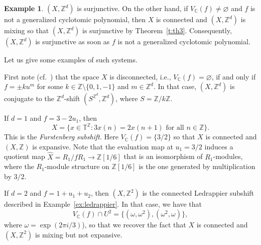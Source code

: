 \documentclass[12pt,a4paper]{amsart}
\theoremstyle{definition}
\newtheorem{example}[theorem]{Example}
\numberwithin{equation}{section}
\begin{document}
\begin{example}
$(X,{\mathbb{Z}}^d)$ is surjunctive.
On the other hand, if
$V_{\mathbb{C}}(f) \not= \varnothing$ and $f$ is not a generalized cyclotomic polynomial,
then $X$ is connected and $(X,{\mathbb{Z}}^d)$ is mixing so that $(X,{\mathbb{Z}}^d)$
is surjunctive 
by  Theorem~\ref{t:th3}.
Consequently, $(X,{\mathbb{Z}}^d)$ is surjunctive as soon as $f$ is not a generalized cyclotomic polynomial.
\par
Let us give some examples of such systems. 
\par
First note (cf.\ \cite[Lemma 6.7]{schmidt-book}) that the space $X$ is disconnected, i.e., $V_{\mathbb{C}}(f) = \varnothing$, if and only if 
$f = \pm k u^m$ for some $k \in {\mathbb{Z}} \setminus \{0, 1,-1\}$ and $m \in {\mathbb{Z}}^d$. In that case, 
$(X,{\mathbb{Z}}^d)$ is conjugate to the ${\mathbb{Z}}^d$-shift $(S^{{\mathbb{Z}}^d}, {\mathbb{Z}}^d)$, where $S = {\mathbb{Z}}/k{\mathbb{Z}}$.
\par
If $d=1$ and $f = 3 - 2u_1$, then 
$$
X  = \{x \in {\mathbb{T}}^{\mathbb{Z}}: 3x(n) = 2x(n+1) \mbox{ for all } n \in {\mathbb{Z}}\}.
$$ This
is the \emph{Furstenberg subshift}.
Here $V_{\mathbb{C}}(f) = \{3/2\}$ so that $X$ is connected and $(X,{\mathbb{Z}})$ is expansive.
Note that the evaluation map at $u_1 = 3/2$ induces a quotient map
$\widehat{X} = R_1/fR_1 \to {\mathbb{Z}}[1/6]$ that is an isomorphism of $R_1$-modules, where the $R_1$-module structure on ${\mathbb{Z}}[1/6]$ is the one generated by multiplication by $3/2$.    
\par
If $d=2$ and $f = 1 + u_1 + u_2$, 
then  $(X, {\mathbb{Z}}^2)$ is the connected Ledrappier subshift described in Example~\ref{ex:ledrappier}.
In that case, we have that
$$
V_{\mathbb{C}}(f) \cap U^2 = \{(\omega,\omega^2), (\omega^2, \omega)\},
$$ 
where $\omega = \exp(2\pi i /3)$), so that we recover the fact that $X$ is connected and  $(X,{\mathbb{Z}}^2)$ is mixing but not expansive.
\end{example}
\end{document}
